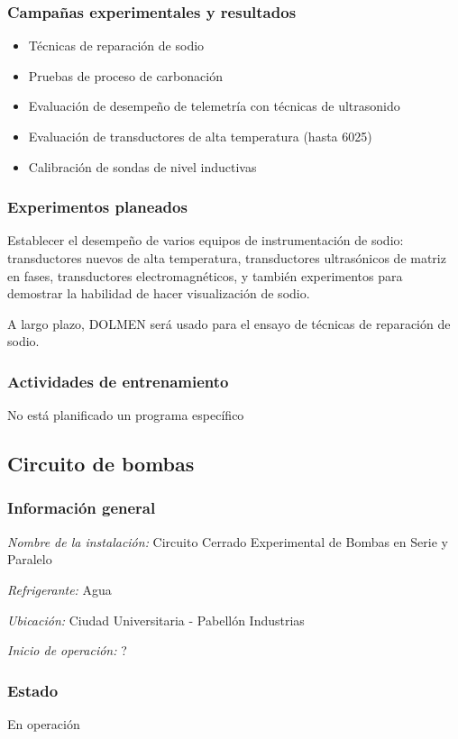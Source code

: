\documentclass{article}
\begin{document}
\subsubsection*{Campañas experimentales y resultados}
\begin{itemize}
    \item Técnicas de reparación de sodio
    \item Pruebas de proceso de carbonación
    \item Evaluación de desempeño de telemetría con técnicas de ultrasonido
    \item Evaluación de transductores de alta temperatura (hasta 6025\celsius)
    \item Calibración de sondas de nivel inductivas
\end{itemize}
\subsubsection*{Experimentos planeados}
Establecer el desempeño de varios equipos de instrumentación de sodio: transductores nuevos de alta temperatura, transductores ultrasónicos de matriz en fases, transductores electromagnéticos, y también experimentos para demostrar la habilidad de hacer visualización de sodio.

A largo plazo, DOLMEN será usado para el ensayo de técnicas de reparación de sodio.
\subsubsection*{Actividades de entrenamiento}
No está planificado un programa específico
\subsection{Circuito de bombas}
\subsubsection*{Información general}
\textit{Nombre de la instalación: }Circuito Cerrado Experimental de Bombas en Serie y Paralelo

\textit{Refrigerante: }Agua

\textit{Ubicación: }Ciudad Universitaria - Pabellón Industrias

\textit{Inicio de operación: }?

\subsubsection*{Estado}
En operación
\end{document}
